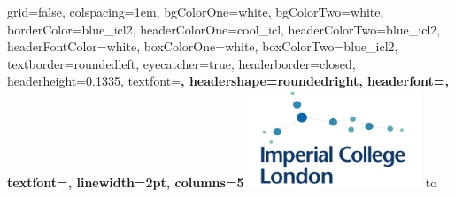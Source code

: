 \documentclass[portrait,final,x11names,a1paper,fontscale=0.40]{baposter}
\begin{document}
\begin{poster}%
  {
  grid=false,
  colspacing=1em,
  bgColorOne=white,
  bgColorTwo=white,
  borderColor=blue_icl2,
  headerColorOne=cool_icl,
  headerColorTwo=blue_icl2,
  headerFontColor=white,
  boxColorOne=white,
  boxColorTwo=blue_icl2,
  textborder=roundedleft,
  eyecatcher=true,
  headerborder=closed,
  headerheight=0.1335\textheight,
  textfont=\bf,
  headershape=roundedright,
  headerfont=\Large\bf,
  textfont={\setlength{\parindent}{1.5em}},
  linewidth=2pt,
  columns=5
  }
  {\includegraphics[width=14em]{icl_eye.pdf}}%
  {\centering{}\vspace{0.5em}}
  {\vspace*{-.3cm}
  \hspace*{0.1cm} 
  \leavevmode\hbox to }



\end{poster}
\end{document}
